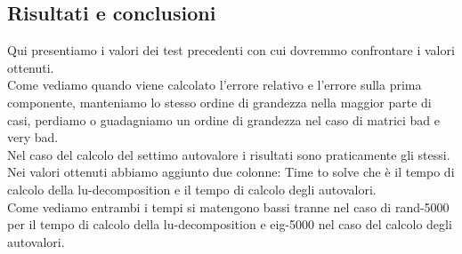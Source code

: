 \documentclass[12pt]{article}
\begin{document}
\newpage


\newpage

\subsection{Risultati e conclusioni}
Qui presentiamo i valori dei test precedenti con cui dovremmo confrontare i valori ottenuti.\\
Come vediamo quando viene calcolato l'errore relativo e l'errore sulla prima componente, manteniamo lo stesso ordine di grandezza nella maggior parte di casi, perdiamo o guadagniamo un ordine di grandezza nel caso di matrici bad e very bad. \\
Nel caso del calcolo del settimo autovalore i risultati sono praticamente gli stessi. \\
Nei valori ottenuti abbiamo aggiunto due colonne: Time to solve che \`e il tempo di calcolo della lu-decomposition e il tempo di calcolo degli autovalori. \\
Come vediamo entrambi i tempi si matengono bassi tranne nel caso di rand-5000 per il tempo di calcolo della lu-decomposition e eig-5000 nel caso del calcolo degli autovalori. \\
\end{document}
